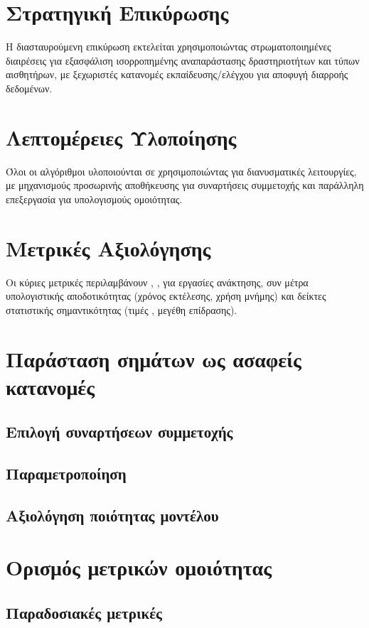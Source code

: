\section{Στρατηγική Επικύρωσης}
Η διασταυρούμενη επικύρωση εκτελείται χρησιμοποιώντας στρωματοποιημένες διαιρέσεις για εξασφάλιση ισορροπημένης αναπαράστασης δραστηριοτήτων και τύπων αισθητήρων, με ξεχωριστές κατανομές εκπαίδευσης/ελέγχου για αποφυγή διαρροής δεδομένων.

\section{Λεπτομέρειες Υλοποίησης}
Όλοι οι αλγόριθμοι υλοποιούνται σε  χρησιμοποιώντας  για διανυσματικές λειτουργίες, με μηχανισμούς προσωρινής αποθήκευσης για συναρτήσεις συμμετοχής και παράλληλη επεξεργασία για υπολογισμούς ομοιότητας.

\section{Μετρικές Αξιολόγησης}
Οι κύριες μετρικές περιλαμβάνουν , ,  για εργασίες ανάκτησης, συν μέτρα υπολογιστικής αποδοτικότητας (χρόνος εκτέλεσης, χρήση μνήμης) και δείκτες στατιστικής σημαντικότητας (τιμές , μεγέθη επίδρασης).


\section{Παράσταση σημάτων ως ασαφείς κατανομές}
\subsection{Επιλογή συναρτήσεων συμμετοχής}
\subsection{Παραμετροποίηση}
\subsection{Αξιολόγηση ποιότητας μοντέλου}

\section{Ορισμός μετρικών ομοιότητας}
\subsection{Παραδοσιακές μετρικές}
